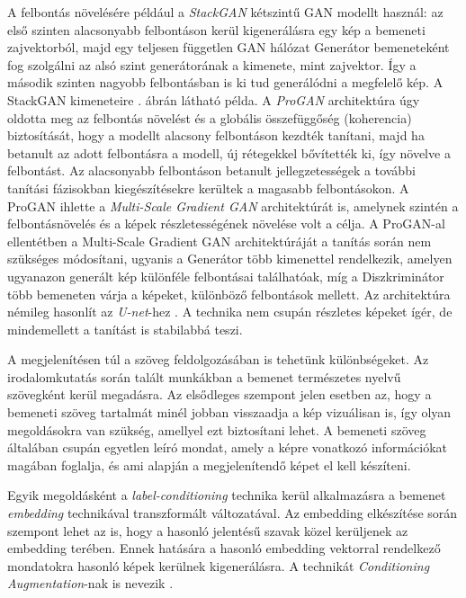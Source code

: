 A felbontás növelésére például a \textit{StackGAN} \cite{zhang2017stackgan} kétszintű GAN modellt használ: az első szinten alacsonyabb felbontáson kerül kigenerálásra egy kép a bemeneti zajvektorból, majd egy teljesen független GAN hálózat Generátor bemeneteként fog szolgálni az alsó szint generátorának a kimenete, mint zajvektor. Így a második szinten nagyobb felbontásban is ki tud generálódni a megfelelő kép. A StackGAN kimeneteire . ábrán látható példa.
A \textit{ProGAN} \cite{karras2017progressive} architektúra úgy oldotta meg az felbontás növelést és a globális összefüggőség (koherencia) biztosítását, hogy a modellt alacsony felbontáson kezdték tanítani, majd ha betanult az adott felbontásra a modell, új rétegekkel bővítették ki, így növelve a felbontást. Az alacsonyabb felbontáson betanult jellegzetességek a további tanítási fázisokban kiegészítésekre kerültek a magasabb felbontásokon. A ProGAN ihlette a \textit{Multi-Scale Gradient GAN} \cite{karnewar2020msg} architektúrát is, amelynek szintén a felbontásnövelés és a képek részletességének növelése volt a célja. A ProGAN-al ellentétben a Multi-Scale Gradient GAN architektúráját a tanítás során nem szükséges módosítani, ugyanis a Generátor több kimenettel rendelkezik, amelyen ugyanazon generált kép különféle felbontásai találhatóak, míg a Diszkriminátor több bemeneten várja a képeket, különböző felbontások mellett. Az architektúra némileg hasonlít az \textit{U-net}-hez \cite{ronneberger2015u}. A technika nem csupán részletes képeket ígér, de mindemellett a tanítást is stabilabbá teszi.


A megjelenítésen túl a szöveg feldolgozásában is tehetünk különbségeket. Az irodalomkutatás során talált munkákban a bemenet természetes nyelvű szövegként kerül megadásra. Az elsődleges szempont jelen esetben az, hogy a bemeneti szöveg tartalmát minél jobban visszaadja a kép vizuálisan is, így olyan megoldásokra van szükség, amellyel ezt biztosítani lehet. A bemeneti szöveg általában csupán egyetlen leíró mondat, amely a képre vonatkozó információkat magában foglalja, és ami alapján a megjelenítendő képet el kell készíteni.

Egyik megoldásként a \textit{label-conditioning} \cite{mirza2014conditional} technika kerül alkalmazásra a bemenet \textit{embedding} technikával transzformált változatával. Az embedding elkészítése során szempont lehet az is, hogy a hasonló jelentésű szavak közel kerüljenek az embedding terében. Ennek hatására a hasonló embedding vektorral rendelkező mondatokra hasonló képek kerülnek kigenerálásra. A technikát \textit{Conditioning Augmentation}-nak is nevezik \cite{reed2016learning, zhang2017stackgan}.

